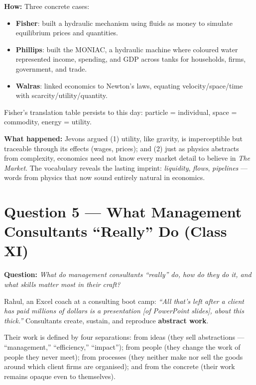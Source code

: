 \documentclass[a4paper,12pt]{article}
\begin{document}
\textbf{How:} Three concrete cases:
\begin{itemize}
  \item \textbf{Fisher}: built a hydraulic mechanism using fluids as money to simulate equilibrium prices and quantities.
  \item \textbf{Phillips}: built the MONIAC, a hydraulic machine where coloured water represented income, spending, and GDP across tanks for households, firms, government, and trade.
  \item \textbf{Walras}: linked economics to Newton's laws, equating velocity/space/time with scarcity/utility/quantity.
\end{itemize}

Fisher's translation table persists to this day: particle = individual, space = commodity, energy = utility.

\textbf{What happened:} Jevons argued (1) utility, like gravity, is imperceptible but traceable through its effects (wages, prices); and (2) just as physics abstracts from complexity, economics need not know every market detail to believe in \textit{The Market}. The vocabulary reveals the lasting imprint: \textit{liquidity}, \textit{flows}, \textit{pipelines} --- words from physics that now sound entirely natural in economics.

\vspace{1.5em}

\section{Question 5 — What Management Consultants ``Really'' Do (Class XI)}

\textbf{Question:} \textit{What do management consultants ``really'' do, how do they do it, and what skills matter most in their craft?}

Rahul, an Excel coach at a consulting boot camp: \textit{``All that's left after a client has paid millions of dollars is a presentation [of PowerPoint slides], about this thick.''} Consultants create, sustain, and reproduce \textbf{abstract work}.

Their work is defined by four separations: from ideas (they sell abstractions --- ``management,'' ``efficiency,'' ``impact''); from people (they change the work of people they never meet); from processes (they neither make nor sell the goods around which client firms are organised); and from the concrete (their work remains opaque even to themselves).
\end{document}
